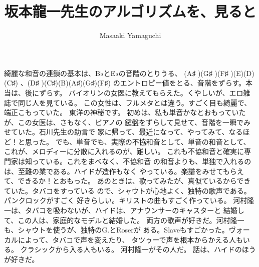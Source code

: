 \documentclass{jsarticle}
\begin{document}
\title{坂本龍一先生のアルゴリズムを、見ると}
\author{Masaaki Yamaguchi}
\date{}
\maketitle



         綺麗な和音の連鎖の基本は、B♭とE♭の音階のとりうる、
    (A♯ )(G♯ )(F♯ )(E)(D)(C♯) 、(D♯ )(C♯)(B)(A♯)(G♯)(F♯)
    のエントロピー値をとる、音階をずらす。本当は、後にずらす。
    バイオリンの女医に教えてもらえた。くやしいが、エロ雑誌で同じ人を見ている。
    この女性は、フルメタとは違う。すごく目も綺麗で、端正こもっていた。
    東洋の神秘です。
    初めは、私も単音かなとおもっていたが、この女医は、さもなく、ビアノの
    鍵盤をずらして見せて、音階を一瞬でみせていた。石川先生の助言で
    家に帰って、最近になって、やってみて、なるほど！と思った。
    でも、単音でも、実際の不協和音として、単音の和音として、
    これが、メロディーに分散に入れるのが、難しい。
    これも不協和音と確実に専門家は知っている。これをまべなく、不協和音
    の和音よりも、単独で入れるのは、至難の業である。ハイドが造作もなく
    やっている。楽譜をみせてもらえて、できるか！とおもった。
    あのときは、歌ってみたが、真似ているからできていた。タバコをすっている
    ので、シャウトが心地よく、独特の歌声である。パンクロックがすごく
    好きらしい。キリストの曲もすごく作っている。
    河村隆一は、タバコを吸わないが、ハイドは、アナウンサーのキャスターと
    結婚して、この人は、家庭的なモデルと結婚した。
    両方の歌声が好きだ。河村隆一も、シャウトを使うが、独特のG.とRoserが
    ある。Slaveもすごかった。ヴォーカルによって、タバコで声を変えたり、
    タツゥーで声を根本からかえる人もいる。
    クラシックから入る人もいる。
    河村隆一がその人だ。
    話は、ハイドのほうが好きだ。　
\end{document}

